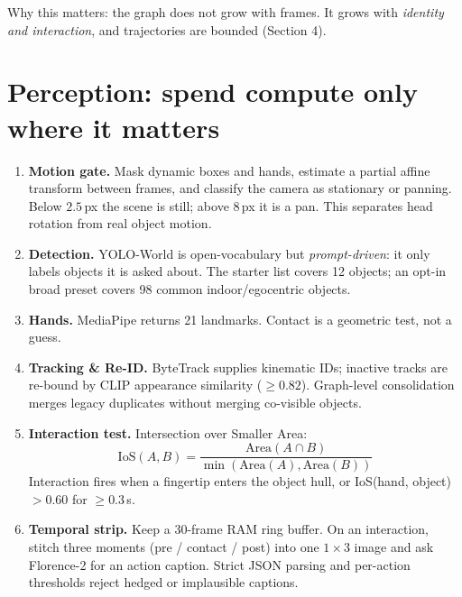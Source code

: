 \documentclass[10pt,a4paper]{article}
\begin{document}
Why this matters: the graph does not grow with frames. It grows with \emph{identity and
interaction}, and trajectories are bounded (Section 4).

\section{Perception: spend compute only where it matters}

\begin{enumerate}[leftmargin=1.1em,itemsep=1pt,topsep=1pt]
  \item \textbf{Motion gate.} Mask dynamic boxes and hands, estimate a partial affine transform
  between frames, and classify the camera as stationary or panning. Below $2.5$\,px the scene is
  still; above $8$\,px it is a pan. This separates head rotation from real object motion.
  \item \textbf{Detection.} YOLO-World is open-vocabulary but \emph{prompt-driven}: it only
  labels objects it is asked about. The starter list covers 12 objects; an opt-in broad preset
  covers 98 common indoor/egocentric objects.
  \item \textbf{Hands.} MediaPipe returns 21 landmarks. Contact is a geometric test, not a guess.
  \item \textbf{Tracking \& Re-ID.} ByteTrack supplies kinematic IDs; inactive tracks are
  re-bound by CLIP appearance similarity ($\geq 0.82$). Graph-level consolidation merges legacy
  duplicates without merging co-visible objects.
  \item \textbf{Interaction test.} Intersection over Smaller Area:
  \[
    \mathrm{IoS}(A,B)=\frac{\mathrm{Area}(A\cap B)}{\min(\mathrm{Area}(A),\mathrm{Area}(B))}
  \]
  Interaction fires when a fingertip enters the object hull, or IoS(hand, object) $>0.60$ for
  $\geq 0.3$\,s.
  \item \textbf{Temporal strip.} Keep a 30-frame RAM ring buffer. On an interaction, stitch three
  moments (pre / contact / post) into one $1\times3$ image and ask Florence-2 for an action
  caption. Strict JSON parsing and per-action thresholds reject hedged or implausible captions.
\end{enumerate}
\end{document}
